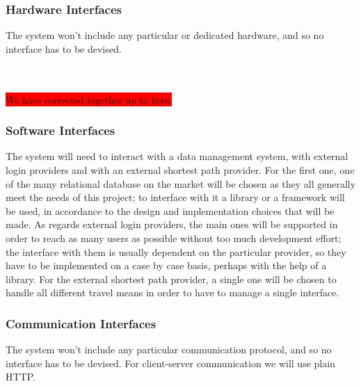 \subsubsection{Hardware Interfaces}

The system won't include any particular or dedicated hardware, and so no interface has to be devised.

~\\
~\\
\colorbox{red}{We have corrected together up to here.}
~\\

\subsubsection{Software Interfaces}

The system will need to interact with a data management system, with external login providers and with an external shortest path provider.
For the first one, one of the many relational database on the market will be chosen as they all generally meet the needs of this project; to interface with it a library or a framework will be used, in accordance to the design and implementation choices that will be made.
As regards external login providers, the main ones will be supported in order to reach as many users as possible without too much development effort; the interface with them is usually dependent on the particular provider, so they have to be implemented on a case by case basis, perhaps with the help of a library.
For the external shortest path provider, a single one will be chosen to handle all different travel means in order to have to manage a single interface.

\subsubsection{Communication Interfaces}

The system won't include any particular communication protocol, and so no interface has to be devised. For client-server communication we will use plain HTTP.